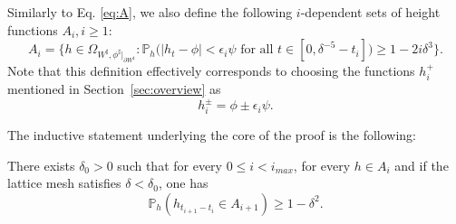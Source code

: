 \documentclass[AHL,Unicode,longabstracts,published]{cedram}
\renewcommand{\P}{\mathbb{P}}
\renewcommand{\d}{{\sharp }}
\begin{document}
Similarly to Eq. \eqref{eq:A}, we also define the following $i$-dependent sets of height functions $A_i, i\ge1$:
\begin{equation}\label{eq:Ai}
A_i=\Big\{h\in \Omega_{W^\d,\phi^\d|_{\partial W^\d}}:\P_h\Big(|h_t-\phi|<\epsilon_i\psi \text{ for all }t\in [0,\delta^{-5}-t_i]\Big)\geq 1 -2i\delta^3 \Big\}.
\end{equation}
Note that this definition effectively corresponds to choosing the functions $h^+_i$ mentioned in Section~\ref{sec:overview} as
\begin{equation}\label{eq:hhpsi}
h_i^\pm=\phi\pm\epsilon_i \psi.
\end{equation}


The inductive statement underlying the core of the proof is the following:

\begin{theo}\label{th:core}
There exists $\delta_0>0 $ such that for every $0 \leq i < i_{max}$, for every $h \in A_i$ and if the lattice mesh satisfies $\delta<\delta_0$, one has
\begin{equation}\label{eq:core}
\P_h(h_{t_{i+1} - t_{i}} \in A_{i+1}) \geq 1 - \delta^2.
\end{equation}
\end{theo}
\end{document}
